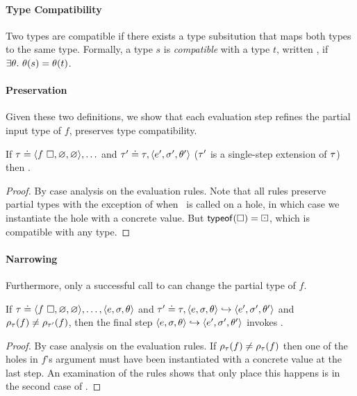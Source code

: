 \paragraph{Type Compatibility}
Two types are compatible if there exists a type subsitution that maps both
types to the same type.
%
Formally, a type $s$ is
\emph{compatible} with a type $t$, written , if
$\exists \theta.\ \theta(s) = \theta(t)$.

\paragraph{Preservation}
Given these two definitions, we show that each evaluation step
refines the partial input type of $f$, \ie preserves type compatibility.
%
\begin{lem}
\label{lem:refine-partial}
If $\tau \doteq \langle f\ \square{}, \varnothing, \varnothing \rangle,\ldots$ and
$\tau' \doteq \tau, \langle e', \sigma', \theta' \rangle$ (\ie $\tau'$ is a single-step
extension of $\tau$)
%
%
then .
\end{lem}
\begin{proof}
  By case analysis on the evaluation rules.
  Note that all rules preserve partial types with the exception of when
  \forcesym\ is called on a hole, in which case we instantiate the hole with
  a concrete value.
  But $\mathsf{typeof}(\square{}) = \boxdot{}$, which is compatible with any type.
\end{proof}

\paragraph{Narrowing}
%
Furthermore, only a successful call to \forcesym can change the partial type of $f$.
%
\begin{lem}
\label{lem:force-inst}
If
$\tau \doteq \langle f\ \square{}, \varnothing, \varnothing \rangle,\ldots,\langle e, \sigma, \theta \rangle$
and
$\tau' \doteq \tau, \langle e, \sigma, \theta \rangle \hookrightarrow \langle e', \sigma', \theta' \rangle$
and
$\rho_{\tau}(f) \neq \rho_{\tau'}(f)$,
then the final step $\langle e, \sigma, \theta \rangle \hookrightarrow \langle e', \sigma', \theta' \rangle$ invokes \forcesym.
\end{lem}

\begin{proof}
  By case analysis on the evaluation rules.
  If $\rho_{\tau}(f) \neq \rho_{\tau}(f)$ then one of the holes in $f$'s
  argument must have been instantiated with a concrete value at the last step.
  An examination of the rules shows that only place this happens is
  in the second case of \forcesym.
\end{proof}

